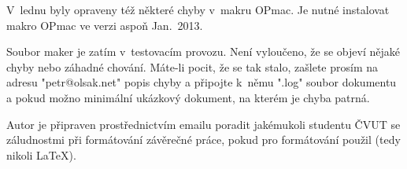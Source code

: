 V~lednu byly opraveny též některé chyby v~makru OPmac. Je nutné
instalovat makro OPmac ve verzi aspoň Jan.~2013.

Soubor maker \ctustyle{} je zatím v~testovacím provozu. Není vyloučeno, že
se objeví nějaké chyby nebo záhadné chování. Máte-li pocit, že se tak stalo,
zašlete prosím na adresu "petr@olsak.net" popis chyby a připojte k~němu
".log" soubor dokumentu a pokud možno minimální ukázkový dokument, na kterém
je chyba patrná.

Autor \ctustyle{} je připraven prostřednictvím emailu poradit
jakémukoli studentu ČVUT se záludnostmi při formátování závěrečné práce,
pokud pro formátování použil \csplain{} (tedy nikoli \LaTeX).

